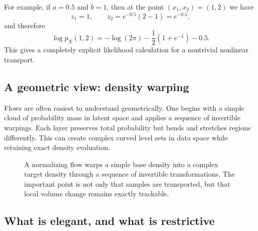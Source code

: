 For example, if $a=0.5$ and $b=1$, then at the point $(x_1,x_2)=(1,2)$ we have
\[
z_1=1,
\qquad
z_2=e^{-0.5}(2-1)=e^{-0.5},
\]
and therefore
\[
\log p_X(1,2)
=
-\log(2\pi)
-\frac{1}{2}\left(1+e^{-1}\right)
-0.5.
\]
This gives a completely explicit likelihood calculation for a nontrivial nonlinear transport.

\subsection*{A geometric view: density warping}

Flows are often easiest to understand geometrically.
One begins with a simple cloud of probability mass in latent space and applies a sequence of invertible warpings.
Each layer preserves total probability but bends and stretches regions differently.
This can create complex curved level sets in data space while retaining exact density evaluation.

\begin{figure}[h]
\centering
{}
\caption{A normalizing flow warps a simple base density into a complex target density through a sequence of invertible transformations. The important point is not only that samples are transported, but that local volume change remains exactly trackable.}
\end{figure}

\subsection*{What is elegant, and what is restrictive}

